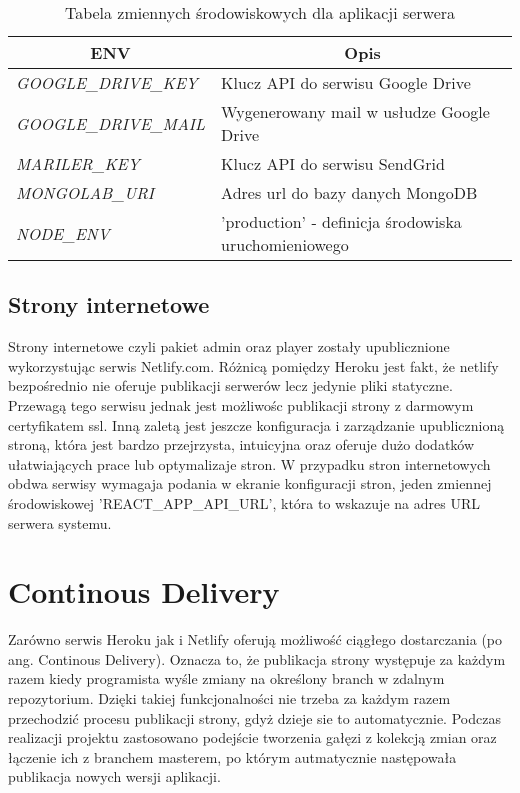 \begin{table}[h!]
\centering
\begin{tabular}{|l|l|}
\hline
\multicolumn{1}{|c|}{\textbf{ENV}} & \multicolumn{1}{c|}{\textbf{Opis}} \\ \hline
\textit{GOOGLE\_DRIVE\_KEY} & Klucz API do serwisu Google Drive \\ \hline
\textit{GOOGLE\_DRIVE\_MAIL} & Wygenerowany mail w usłudze Google Drive \\ \hline
\textit{MARILER\_KEY} & Klucz API do serwisu SendGrid \\ \hline
\textit{MONGOLAB\_URI} & Adres url do bazy danych MongoDB \\ \hline
\textit{NODE\_ENV} & 'production' - definicja środowiska uruchomieniowego \\ \hline
\end{tabular}
\caption{Tabela zmiennych środowiskowych dla aplikacji serwera}
\end{table}

\subsection{Strony internetowe}
Strony internetowe czyli pakiet admin oraz player zostały upublicznione wykorzystując serwis Netlify.com. Różnicą pomiędzy Heroku jest fakt, że netlify bezpośrednio nie oferuje publikacji serwerów lecz jedynie pliki statyczne. Przewagą tego serwisu jednak jest możliwośc publikacji strony z darmowym certyfikatem ssl. Inną zaletą jest jeszcze konfiguracja i zarządzanie upublicznioną stroną, która jest bardzo przejrzysta, intuicyjna oraz oferuje dużo dodatków ułatwiających prace lub optymalizaje stron. W przypadku stron internetowych obdwa serwisy wymagaja podania w ekranie konfiguracji stron, jeden zmiennej środowiskowej 'REACT\_APP\_API\_URL', która to wskazuje na adres URL serwera systemu.


\section{Continous Delivery}
Zarówno serwis Heroku jak i Netlify oferują możliwość ciągłego dostarczania (po ang. Continous Delivery). Oznacza to, że publikacja strony występuje za każdym razem kiedy programista wyśle zmiany na określony branch w zdalnym repozytorium. Dzięki takiej funkcjonalności nie trzeba za każdym razem przechodzić procesu publikacji strony, gdyż dzieje sie to automatycznie. Podczas realizacji projektu zastosowano podejście tworzenia gałęzi z kolekcją zmian oraz łączenie ich z branchem masterem, po którym autmatycznie następowała publikacja nowych wersji aplikacji.